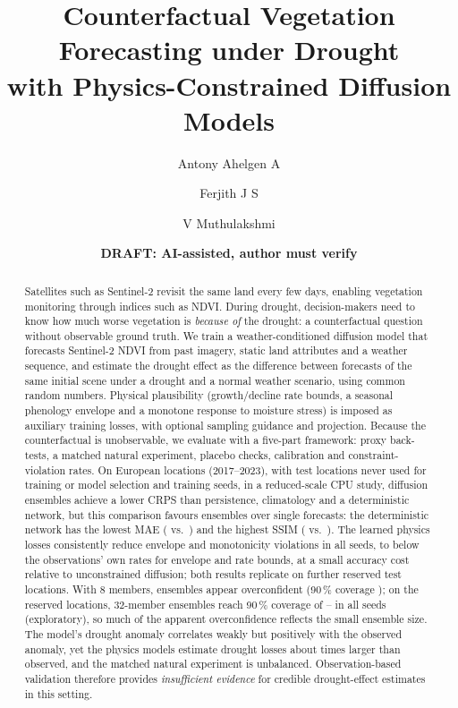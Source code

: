\documentclass[10pt]{article}
\title{Counterfactual Vegetation Forecasting under Drought\\with Physics-Constrained Diffusion Models}
\author{Antony Ahelgen A \and Ferjith J S \and V Muthulakshmi}
\date{\textbf{DRAFT: AI-assisted, author must verify}}
\begin{document}
\maketitle

\begin{abstract}
Satellites such as Sentinel-2 revisit the same land every few days, enabling vegetation monitoring through indices
such as NDVI. During drought, decision-makers need to know how much worse vegetation is \emph{because of} the drought:
a counterfactual question without observable ground truth. We train a weather-conditioned diffusion model that
forecasts Sentinel-2 NDVI from past imagery, static land attributes and a weather sequence, and estimate the drought
effect as the difference between forecasts of the same initial scene under a drought and a normal weather scenario,
using common random numbers. Physical plausibility (growth/decline rate bounds, a seasonal phenology envelope and a
monotone response to moisture stress) is imposed as auxiliary training losses, with optional sampling guidance and
projection. Because the counterfactual is unobservable, we evaluate with a five-part framework: proxy back-tests, a
matched natural experiment, placebo checks, calibration and constraint-violation rates. On  European
locations (2017--2023), with  test locations never used for training or model selection and
 training seeds, in a reduced-scale CPU study, diffusion ensembles achieve a lower CRPS than persistence,
climatology and a deterministic network, but this comparison favours ensembles over single forecasts: the
deterministic network has the lowest MAE ( vs.\ ) and the highest SSIM
( vs.\ ). The learned physics losses consistently reduce envelope and
monotonicity violations in all seeds, to below the observations' own rates for envelope and rate bounds, at a small
accuracy cost relative to unconstrained diffusion; both results replicate on  further reserved test locations. With 8
members, ensembles appear overconfident (90\,\% coverage ); on the reserved locations,
32-member ensembles reach 90\,\% coverage of -- in all
seeds (exploratory), so much of the apparent overconfidence reflects the small ensemble size. The model's drought anomaly correlates weakly but positively with the
observed anomaly, yet the physics models estimate drought losses about  times larger
than observed, and the matched natural experiment is unbalanced. Observation-based validation therefore provides
\emph{insufficient evidence} for credible drought-effect estimates in this setting.
\end{abstract}
\end{document}
